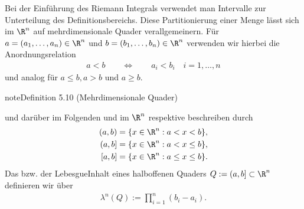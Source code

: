 \documentclass[letterpaper,10pt,german]{jupyterBook}
\begin{document}
\sphinxAtStartPar
Bei der Einführung des Riemann Integrals verwendet man Intervalle zur Unterteilung des Definitionsbereichs.
Diese Partitionierung einer Menge lässt sich im \(\R^n\) auf mehrdimensionale Quader verallgemeinern. Für \(a = (a_1,\ldots,a_n) \in \R^n\) und \(b = (b_1,\ldots,b_n) \in \R^n\) verwenden wir hierbei die Anordnungsrelation
\begin{equation*}
\begin{split}a < b \qquad \Leftrightarrow \qquad a_i < b_i \quad i=1,\ldots,n\end{split}
\end{equation*}
\sphinxAtStartPar
und analog für \(a \leq b, a > b\) und \(a \geq b\).
\label{masstheorie/masstheorie:def:quader}
\begin{sphinxadmonition}{note}{Definition 5.10 (Mehrdimensionale Quader)}



\sphinxAtStartPar
und darüber im Folgenden  und  im \(\R^n\) respektive beschreiben durch
\begin{equation*}
\begin{split}(a,b) &= \lbrace x \in \R^n : a < x < b \rbrace,\\
(a,b] &= \lbrace x \in \R^n : a < x \leq b \rbrace,\\
[a,b] &= \lbrace x \in \R^n : a \leq x \leq b \rbrace.\end{split}
\end{equation*}
\sphinxAtStartPar
Das  bzw. der Lebesgue\sphinxhyphen{}Inhalt eines halboffenen Quaders \(Q := (a,b] \subset \R^n\) definieren wir über
\begin{equation*}
\begin{split}\lambda^n(Q) := \prod_{i=1}^n (b_i - a_i).\end{split}
\end{equation*}\end{sphinxadmonition}
\end{document}
